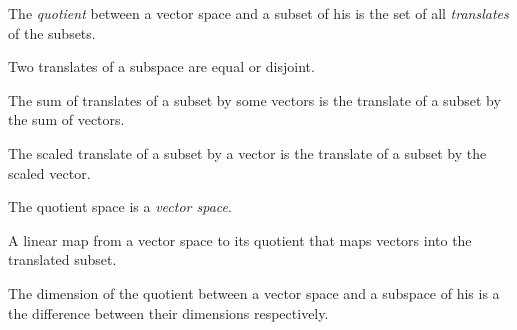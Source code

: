 \begin{multicols}{3}
  The \textit{quotient} between a vector space and a subset of his is the set of all
  \textit{translates} of the subsets.

  Two translates of a subspace are equal or disjoint.

  The sum of translates of a subset by some vectors
  is the translate of a subset by the sum of vectors.
  
  The scaled translate of a subset by a vector
  is the translate of a subset by the scaled vector.

  The quotient space is a \textit{vector space}.

  A linear map from a vector space to its quotient that maps vectors
  into the translated subset.

  The dimension of the quotient between a vector space and a subspace of his
  is a the difference between their dimensions respectively.
  
\end{multicols}


